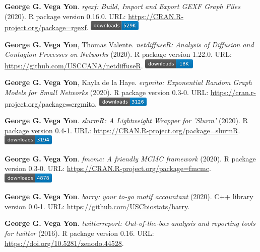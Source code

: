\documentclass[letterpaper, 11pt]{article}
\begin{document}
\begin{enumerate}[label={[}\arabic*{]},labelindent=5\parindent,labelsep=8pt]
\item {\bfseries George G.} {\bfseries Vega Yon}. \textit{rgexf: Build, Import and Export GEXF Graph Files} (2020). R package version 0.16.0. {\small URL}: \url{https://CRAN.R-project.org/package=rgexf}. \includegraphics[width=2.5cm]{fig/cran-downloads-rgexf.pdf} 
\item {\bfseries George G.} {\bfseries Vega Yon}, Thomas Valente. \textit{{{netdiffuseR: Analysis of Diffusion and Contagion Processes on Networks}}} (2020). R package version 1.22.0. {\small URL}: \url{https://github.com/USCCANA/netdiffuseR}. \includegraphics[width=2.5cm]{fig/cran-downloads-netdiffuser.pdf} 
\item {\bfseries George G.} {\bfseries Vega Yon}, Kayla de la Haye. \textit{ergmito: Exponential Random Graph Models for Small Networks} (2020). R package version 0.3-0. {\small URL}: \url{https://cran.r-project.org/package=ergmito}. \includegraphics[width=2.5cm]{fig/cran-downloads-ergmito.pdf} 
\item {\bfseries George G.} {\bfseries Vega Yon}. \textit{slurmR: A Lightweight Wrapper for 'Slurm'} (2020). R package version 0.4-1. {\small URL}: \url{https://CRAN.R-project.org/package=slurmR}. \includegraphics[width=2.5cm]{fig/cran-downloads-slurmr.pdf} 
\item {\bfseries George G.} {\bfseries Vega Yon}. \textit{fmcmc: A friendly MCMC framework} (2020). R package version 0.3-0. {\small URL}: \url{https://CRAN.R-project.org/package=fmcmc}. \includegraphics[width=2.5cm]{fig/cran-downloads-fmcmc.pdf} 
\item {\bfseries George G.} {\bfseries Vega Yon}. \textit{barry: your to-go motif accountant} (2020). C++ library version 0.0-1. {\small URL}: \url{https://github.com/USCbiostats/barry}.  
\item {\bfseries George G.} {\bfseries Vega Yon}. \textit{{twitterreport: Out-of-the-box analysis and 
		reporting tools for twitter}} (2016). R package version 0.16. {\small URL}: \url{https://doi.org/10.5281/zenodo.44528}.  
\end{enumerate}
\end{document}
